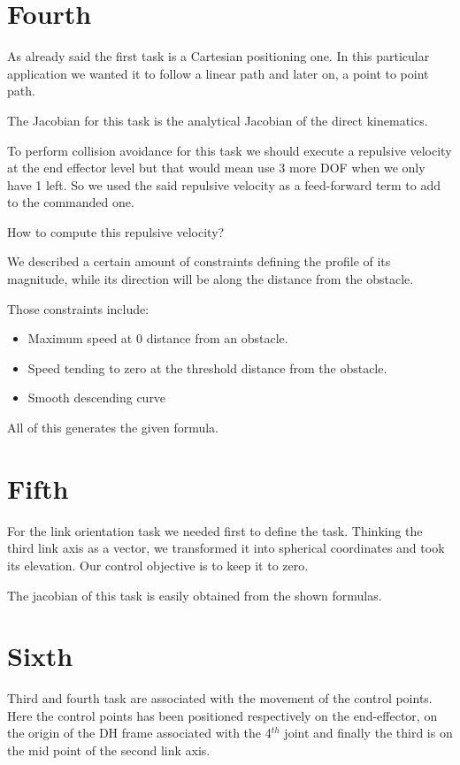 \documentclass[12pt, a4paper]{article}
\begin{document}
\section{Fourth}

As already said the first task is a Cartesian positioning one. In this particular application we wanted it to follow a linear path and later on, a point to point path.

The Jacobian for this task is the analytical Jacobian of the direct kinematics.

To perform collision avoidance for this task we should execute a repulsive velocity at the end effector level but that would mean use 3 more DOF when we only have 1 left. So we used the said repulsive velocity as a feed-forward term to add to the commanded one.

How to compute this repulsive velocity?

We described a certain amount of constraints defining the profile of its magnitude, while its direction will be along the distance from the obstacle. 

Those constraints include:
\begin{itemize}
\item Maximum speed at 0 distance from an obstacle.
\item Speed tending to zero at the threshold distance from the obstacle.
\item Smooth descending curve
\end{itemize}

All of this generates the given formula.

\section{Fifth}

For the link orientation task we needed first to define the task. Thinking the third link axis as a vector, we transformed it into spherical coordinates and took its elevation. Our control objective is to keep it to zero.

The jacobian of this task is easily obtained from the shown formulas.

\section{Sixth}

Third and fourth task are associated with the movement of the control points. Here the control points has been positioned respectively on the end-effector, on the origin of the DH frame associated with the 4$^{th}$ joint and finally the third is on the mid point of the second link axis.
\end{document}
